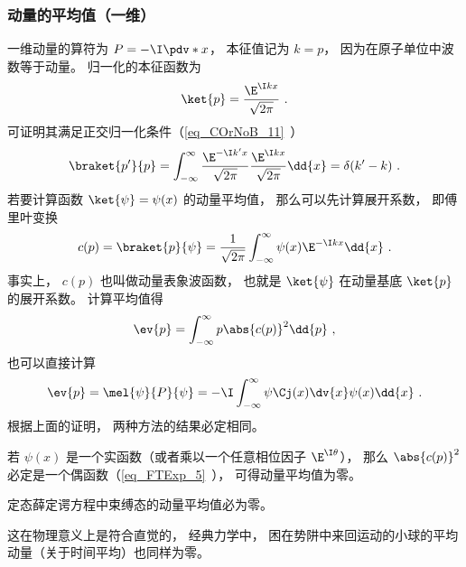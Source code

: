 \subsubsection{动量的平均值（一维）}
一维动量的算符为 $P = -\I\pdv*{x}$， 本征值记为 $k = p$， 因为在原子单位中波数等于动量。 归一化的本征函数为
\begin{equation}
\ket{p} = \frac{\E^{\I k x}}{\sqrt{2\pi}}~.
\end{equation}
可证明其满足正交归一化条件（\autoref{eq_COrNoB_11}~）
\begin{equation}
\braket{p'}{p} = \int_{-\infty}^{\infty} \frac{\E^{-\I k' x}}{\sqrt{2\pi}} \frac{\E^{\I k x}}{\sqrt{2\pi}} \dd{x} = \delta(k' - k)~.
\end{equation}
若要计算函数 $\ket{\psi} = \psi(x)$ 的动量平均值， 那么可以先计算展开系数， 即傅里叶变换
\begin{equation}
c(p) = \braket{p}{\psi} = \frac{1}{\sqrt{2\pi}}\int_{-\infty}^{\infty} \psi(x)\E^{-\I kx} \dd{x}~.
\end{equation}
事实上， $c(p)$ 也叫做动量表象波函数， 也就是 $\ket{\psi}$ 在动量基底 $\ket{p}$ 的展开系数。 计算平均值得
\begin{equation}
\ev{p} = \int_{-\infty}^{\infty} p \abs{c(p)}^2\dd{p}~,
\end{equation}
也可以直接计算
\begin{equation}
\ev{p} = \mel{\psi}{P}{\psi} = -\I\int_{-\infty}^{\infty} \psi\Cj(x) \dv{x} \psi(x) \dd{x}~.
\end{equation}
根据上面的证明， 两种方法的结果必定相同。

\begin{theorem}{}\label{the_QMavg_1}
若 $\psi(x)$ 是一个实函数（或者乘以一个任意相位因子 $\E^{\I \theta}$）， 那么 $\abs{c(p)}^2$ 必定是一个偶函数（\autoref{eq_FTExp_5}~）， 可得动量平均值为零。
\end{theorem}

\begin{corollary}{}
定态薛定谔方程中束缚态的动量平均值必为零。
\end{corollary}
这在物理意义上是符合直觉的， 经典力学中， 困在势阱中来回运动的小球的平均动量（关于时间平均）也同样为零。

